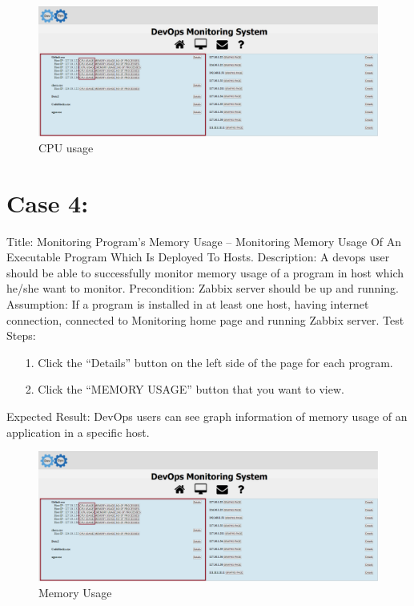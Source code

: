 \documentclass{article}
\begin{document}
		\begin{figure}[H]
		\centering
		\includegraphics[scale=0.4,width=\linewidth]{3}
		\caption{CPU usage}
	\end{figure}
	
	\section*{Case 4:}
	Title: Monitoring Program’s Memory Usage  – Monitoring Memory Usage Of An Executable Program Which Is Deployed To Hosts.
	\newline
	Description: A devops user should be able to successfully monitor memory usage of a program in  host which he/she want to monitor.
	\newline
	Precondition: Zabbix server should be up and running.
	\newline
	Assumption:  If a program is installed in at least one host, having internet connection, connected to Monitoring home page and running Zabbix server.
	\newline
	\newline
	Test Steps:
	\begin{itemize}
	
	
	\item[1.]Click the “Details” button on the left side of the page for each program.
	\item[2.]Click the “MEMORY USAGE” button that you want to view.
	\end{itemize}
	Expected Result: DevOps users can see graph information of memory usage of an application in a specific host.
	
		\begin{figure}[H]
		\centering
		\includegraphics[scale=0.4,width=\linewidth]{3}
		\caption{Memory Usage}
	\end{figure}
\end{document}
